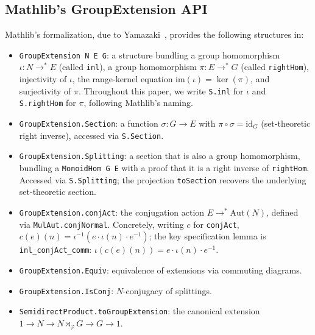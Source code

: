 \documentclass[11pt]{article}
\newcommand{\im}{\mathrm{im}}
\newcommand{\id}{\mathrm{id}}
\newcommand{\Aut}{\mathrm{Aut}}
\newcommand{\lean}[1]{\texttt{#1}}
\begin{document}
\subsection{Mathlib's GroupExtension API}\label{sec:bg-mathlib}

Mathlib's formalization, due to Yamazaki~\cite{Yamazaki2024}, provides the following
structures in\linebreak{}:

\begingroup\sloppy
\begin{itemize}[leftmargin=2em]
  \item \lean{GroupExtension N E G}: a structure bundling a group homomorphism
    $\iota : N \to^* E$ (called \lean{inl}), a group homomorphism
    $\pi : E \to^* G$ (called \lean{rightHom}), injectivity of $\iota$,
    the range-kernel equation $\im(\iota) = \ker(\pi)$, and
    surjectivity of $\pi$.  Throughout this paper, we write \lean{S.inl} for
    $\iota$ and \lean{S.rightHom} for $\pi$, following Mathlib's naming.

  \item \lean{GroupExtension.Section}: a function $\sigma : G \to E$ with
    $\pi \circ \sigma = \id_G$ (set-theoretic right inverse), accessed via
    \lean{S.Section}.

  \item \lean{GroupExtension.Splitting}: a section that is also a group
    homomorphism, bundling a \lean{MonoidHom G E} with a proof that it is a
    right inverse of \lean{rightHom}.  Accessed via \lean{S.Splitting};
    the projection \lean{toSection} recovers the underlying set-theoretic section.

  \item \lean{GroupExtension.conjAct}: the conjugation action $E \to^*
    \Aut(N)$, defined via \lean{MulAut.conjNormal}. Concretely, writing $c$ for \lean{conjAct},\linebreak
    $c(e)(n) = \iota^{-1}(e \cdot \iota(n) \cdot e^{-1})$;
    the key specification lemma is \lean{inl\_conjAct\_comm}:
    $\iota(c(e)(n)) = e \cdot \iota(n) \cdot e^{-1}$.

  \item \lean{GroupExtension.Equiv}: equivalence of extensions via commuting
    diagrams.

  \item \lean{GroupExtension.IsConj}: $N$-conjugacy of splittings.

  \item \lean{SemidirectProduct.toGroupExtension}: the canonical extension
    $1 \to N \to N \rtimes_\varphi G \to G \to 1$.
\end{itemize}
\endgroup
\end{document}

